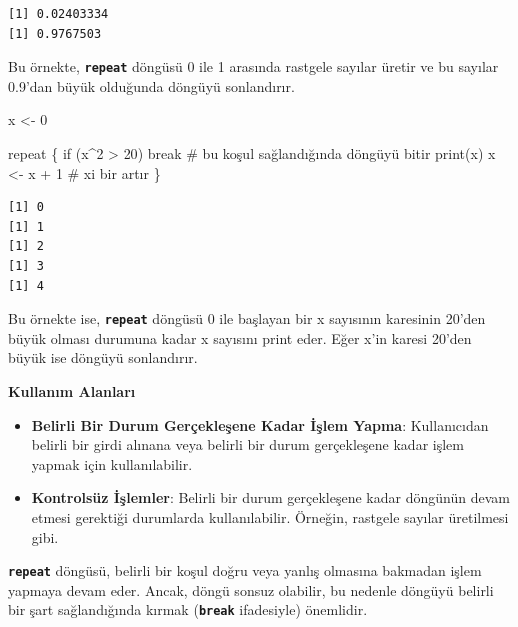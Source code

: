 \documentclass[
  letterpaper,
  DIV=11,
  numbers=noendperiod]{scrreprt}
\newenvironment{Shaded}{\begin{snugshade}}{\end{snugshade}}
\newcommand{\CommentTok}[1]{\textcolor[rgb]{0.37,0.37,0.37}{#1}}
\newcommand{\ControlFlowTok}[1]{\textcolor[rgb]{0.00,0.23,0.31}{#1}}
\newcommand{\DecValTok}[1]{\textcolor[rgb]{0.68,0.00,0.00}{#1}}
\newcommand{\FunctionTok}[1]{\textcolor[rgb]{0.28,0.35,0.67}{#1}}
\newcommand{\NormalTok}[1]{\textcolor[rgb]{0.00,0.23,0.31}{#1}}
\newcommand{\OtherTok}[1]{\textcolor[rgb]{0.00,0.23,0.31}{#1}}
\newcommand{\SpecialCharTok}[1]{\textcolor[rgb]{0.37,0.37,0.37}{#1}}
\begin{document}
\begin{verbatim}
[1] 0.02403334
[1] 0.9767503
\end{verbatim}

Bu örnekte, \textbf{\texttt{repeat}} döngüsü 0 ile 1 arasında rastgele
sayılar üretir ve bu sayılar 0.9'dan büyük olduğunda döngüyü
sonlandırır.

\begin{Shaded}
\begin{Highlighting}[]
\NormalTok{x }\OtherTok{\textless{}{-}} \DecValTok{0}

\ControlFlowTok{repeat}\NormalTok{ \{}
    \ControlFlowTok{if}\NormalTok{ (x}\SpecialCharTok{\^{}}\DecValTok{2} \SpecialCharTok{\textgreater{}} \DecValTok{20}\NormalTok{) }\ControlFlowTok{break}     \CommentTok{\# bu koşul sağlandığında döngüyü bitir}
    \FunctionTok{print}\NormalTok{(x)               }
\NormalTok{    x }\OtherTok{\textless{}{-}}\NormalTok{ x }\SpecialCharTok{+} \DecValTok{1}              \CommentTok{\# x\textquotesingle{}i bir artır}
\NormalTok{\}}
\end{Highlighting}
\end{Shaded}

\begin{verbatim}
[1] 0
[1] 1
[1] 2
[1] 3
[1] 4
\end{verbatim}

Bu örnekte ise, \textbf{\texttt{repeat}} döngüsü 0 ile başlayan bir x
sayısının karesinin 20'den büyük olması durumuna kadar x sayısını print
eder. Eğer x'in karesi 20'den büyük ise döngüyü sonlandırır.

\textbf{Kullanım Alanları}

\begin{itemize}
\item
  \textbf{Belirli Bir Durum Gerçekleşene Kadar İşlem Yapma}:
  Kullanıcıdan belirli bir girdi alınana veya belirli bir durum
  gerçekleşene kadar işlem yapmak için kullanılabilir.
\item
  \textbf{Kontrolsüz İşlemler}: Belirli bir durum gerçekleşene kadar
  döngünün devam etmesi gerektiği durumlarda kullanılabilir. Örneğin,
  rastgele sayılar üretilmesi gibi.
\end{itemize}

\begin{tcolorbox}[enhanced jigsaw, colback=white, coltitle=black, colbacktitle=quarto-callout-warning-color!10!white, opacitybacktitle=0.6, opacityback=0, toprule=.15mm, bottomrule=.15mm, bottomtitle=1mm, rightrule=.15mm, breakable, arc=.35mm, colframe=quarto-callout-warning-color-frame, titlerule=0mm, left=2mm, leftrule=.75mm, toptitle=1mm, title=\textcolor{quarto-callout-warning-color}{\faExclamationTriangle}\hspace{0.5em}{Uyarı}]

\textbf{\texttt{repeat}} döngüsü, belirli bir koşul doğru veya yanlış
olmasına bakmadan işlem yapmaya devam eder. Ancak, döngü sonsuz
olabilir, bu nedenle döngüyü belirli bir şart sağlandığında kırmak
(\textbf{\texttt{break}} ifadesiyle) önemlidir.

\end{tcolorbox}
\end{document}

